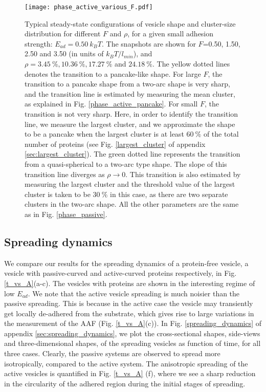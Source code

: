 \documentclass[pre,amsmath]{revtex4}
\begin{document}
\begin{figure}[ht]
\centering
\texttt{[image: phase\_active\_various\_F.pdf]}
\caption{Typical steady-state configurations of vesicle shape and cluster-size distribution for different $F$  and $\rho$, for a given small adhesion strength: $E_{ad}=0.50 ~k_B T$. The snapshots are shown for $F$=0.50, 1.50, 2.50 and 3.50 (in units of $k_B T/l_{min}$), and $\rho=3.45 ~\%, 10.36 ~\%, 17.27 ~\%$ and $24.18 ~\%$. The  yellow dotted lines denotes the transition to a pancake-like shape. For large $F$, the transition to a pancake shape from a two-arc shape is very sharp, and the transition line is estimated by measuring the mean cluster, as explained in Fig. \ref{phase_active_pancake}. For small $F$, the transition is not very sharp. Here, in order to identify the transition line, we measure the largest cluster, and we approximate the shape to be a pancake when the largest cluster is at least $60 ~\%$ of the total number of proteins (see Fig. \ref{largest_cluster} of appendix \ref{sec:largest_cluster}). The green dotted line represents the transition from a quasi-spherical to a two-arc type shape. The slope of this transition line diverges as $\rho \rightarrow 0$. This transition is also estimated by measuring the largest cluster and the threshold value of the largest cluster is taken to be $30 ~\%$ in this case, as there are two separate clusters in the two-arc shape. All the other parameters are the same as in Fig. \ref{phase_passive}. }
\label{phase_F_rho} 
\end{figure}

\subsection{Spreading dynamics}
We compare our results for the spreading dynamics of a protein-free vesicle, a vesicle with passive-curved and active-curved proteins respectively, in Fig. \ref{t_vs_A}(a-c). The vesicles with proteins are shown in the interesting regime of low $E_{ad}$. We note that the active vesicle spreading is much noisier than the passive spreading. This is because in the active case the vesicle may transiently get locally de-adhered from the substrate, which gives rise to large variations in the measurement of the AAF (Fig. \ref{t_vs_A}(c)). In Fig. \ref{spreading_dynamics} of appendix \ref{sec:spreading_dynamics}, we plot the cross-sectional shapes, side-views and three-dimensional shapes, of the spreading vesicles as function of time, for all three cases. Clearly, the passive systems are observed to spread more isotropically, compared to the active system. The anisotropic spreading of the active vesicles is quantified in Fig. \ref{t_vs_A} (f), where we see a sharp reduction in the circularity of the adhered region during the initial stages of spreading.
\end{document}

